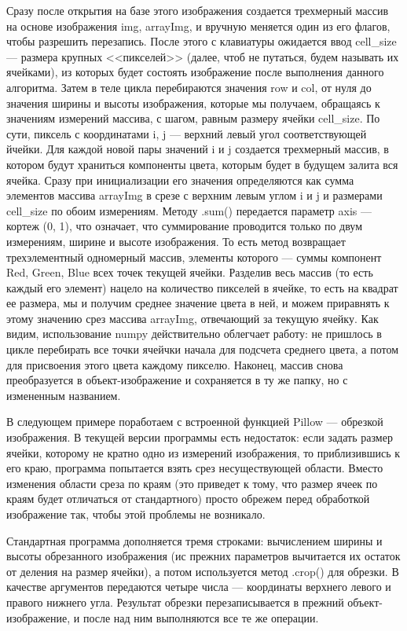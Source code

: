 \documentclass[12pt]{article}
\begin{document}
{	Сразу после открытия на базе этого изображения создается трехмерный массив на основе изображения img, arrayImg, и вручную меняется один из его флагов, чтобы разрешить перезапись. После этого с клавиатуры ожидается ввод cell\_size --- размера крупных <<пикселей>> (далее, чтоб не путаться, будем называть их ячейками), из которых будет состоять изображение после выполнения данного алгоритма. Затем в теле цикла перебираются значения row и col, от нуля до значения ширины и высоты изображения, которые мы получаем, обращаясь к значениям измерений массива, с шагом, равным размеру ячейки cell\_size. По сути, пиксель с координатами i, j --- верхний левый угол соответствующей йчейки. Для каждой новой пары значений i и j создается трехмерный массив, в котором будут храниться компоненты цвета, которым будет в будущем залита вся ячейка. Сразу при инициализации его значения определяются как сумма элементов массива arrayImg в срезе с верхним левым углом i и j и размерами cell\_size по обоим измерениям. Методу .sum() передается параметр axis --- кортеж (0, 1), что означает, что суммирование проводится только по двум измерениям, ширине и высоте изображения. То есть метод возвращает трехэлементный одномерный массив, элементы которого --- суммы компонент Red, Green, Blue всех точек текущей ячейки. Разделив весь массив (то есть каждый его элемент) нацело на количество пикселей в ячейке, то есть на квадрат ее размера, мы и получим среднее значение цвета в ней, и можем приравнять к этому значению срез массива arrayImg, отвечающий за текущую ячейку. Как видим, использование numpy действительно облегчает работу: не пришлось в цикле перебирать все точки ячейчки начала для подсчета среднего цвета, а потом для присвоения этого цвета каждому пикселю. Наконец, массив снова преобразуется в объект-изображение и сохраняется в ту же папку, но с измененным названием.
	
	В следующем примере поработаем с встроенной функцией Pillow --- обрезкой изображения. В текущей версии программы есть недостаток: если задать размер ячейки, которому не кратно одно из измерений изображения, то приблизившись к его краю, программа попытается взять срез несуществующей области. Вместо изменения области среза по краям (это приведет к тому, что размер ячеек по краям будет отличаться от стандартного) просто обрежем перед обработкой изображение так, чтобы этой проблемы не возникало.
	
	
	
	Стандартная программа дополняется тремя строками: вычислением ширины и высоты обрезанного изображения (ис прежних параметров вычитается их остаток от деления на размер ячейки), а потом используется метод .crop() для обрезки. В качестве аргументов передаются четыре числа --- координаты верхнего левого и правого нижнего угла. Результат обрезки перезаписывается в прежний объект-изображение, и после над ним выполняются все те же операции. 
	
}
\end{document}

